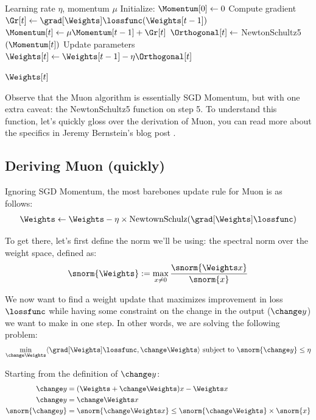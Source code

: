 \documentclass[12pt]{article}
\begin{document}
\begin{algorithm}
\caption{Muon}
\begin{algorithmic}[1]
    \Require Learning rate $\eta$, momentum $\mu$
    \State Initialize: $\Momentum[0] \gets 0$
        \State Compute gradient $\Gr[t] \gets \grad[\Weights]\lossfunc(\Weights[t-1])$
        \State $\Momentum[t] \gets \mu \Momentum[t-1] + \Gr[t]$
        \State $\Orthogonal[t] \gets$ NewtonSchultz5$(\Momentum[t])$
        \State Update parameters $\Weights[t] \gets \Weights[t-1] - \eta\Orthogonal[t]$
    \EndFor

    \State \Return $\Weights[t]$
\end{algorithmic}
\end{algorithm}

Observe that the Muon algorithm is essentially SGD Momentum, but with one extra caveat: the NewtonSchultz5 function on step 5. To understand this function, let's quickly gloss over the derivation of Muon, you can read more about the specifics in Jeremy Bernstein's blog post \cite{bernstein2025deriving}. 

\subsection{Deriving Muon (quickly)}

Ignoring SGD Momentum, the most barebones update rule for Muon is as follows:
\begin{align}
    \Weights \gets \Weights - \eta \times \text{NewtownSchulz}(\grad[\Weights]\lossfunc) \label{base-muon-update}
\end{align}

To get there, let's first define the norm we'll be using: the spectral norm over the weight space, defined as:
\begin{align}
    \snorm{\Weights} := \max_{x \ne 0} \frac{\snorm{\Weights x}}{\snorm{x}}
\end{align}

We now want to find a weight update that maximizes improvement in loss $\lossfunc$ while having some constraint on the change in the output ($\change y$) we want to make in one step. In other words, we are solving the following problem:
\begin{align}
    \min_{\change \Weights} \langle \grad[\Weights]\lossfunc, \change \Weights \rangle \text{ subject to } \snorm{\change y} \le \eta \label{muon}
\end{align}

Starting from the definition of $\change y$: 
\begin{align*}
    \change y &= (\Weights + \change \Weights)x - \Weights x \\
    \change y &= \change \Weights x \\
    \snorm{\change y} &= \snorm{\change \Weights x} \le \snorm{\change \Weights} \times \snorm{x}
\end{align*}
\end{document}
